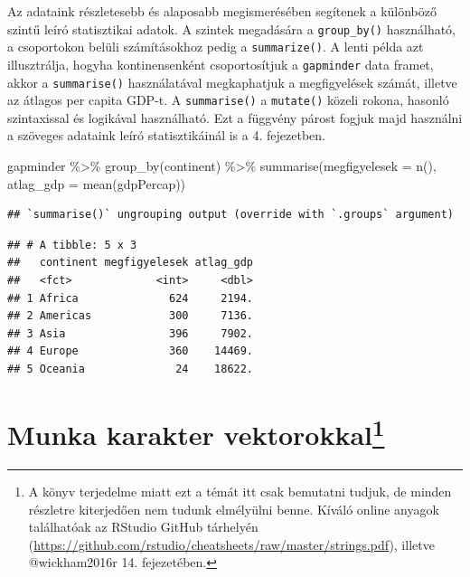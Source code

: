\documentclass[
]{book}
\newenvironment{Shaded}{\begin{snugshade}}{\end{snugshade}}
\newcommand{\AttributeTok}[1]{\textcolor[rgb]{0.77,0.63,0.00}{#1}}
\newcommand{\FunctionTok}[1]{\textcolor[rgb]{0.00,0.00,0.00}{#1}}
\newcommand{\NormalTok}[1]{#1}
\newcommand{\SpecialCharTok}[1]{\textcolor[rgb]{0.00,0.00,0.00}{#1}}
\begin{document}
Az adataink részletesebb és alaposabb megismerésében segítenek a
különböző szintű leíró statisztikai adatok. A szintek megadására a
\texttt{group\_by()} használható, a csoportokon belüli számításokhoz
pedig a \texttt{summarize()}. A lenti példa azt illusztrálja, hogyha
kontinensenként csoportosítjuk a \texttt{gapminder} data framet, akkor a
\texttt{summarise()} használatával megkaphatjuk a megfigyelések számát,
illetve az átlagos per capita GDP-t. A \texttt{summarise()} a
\texttt{mutate()} közeli rokona, hasonló szintaxissal és logikával
használható. Ezt a függvény párost fogjuk majd használni a szöveges
adataink leíró statisztikáinál is a 4. fejezetben.

\begin{Shaded}
\begin{Highlighting}[]
\NormalTok{gapminder }\SpecialCharTok{\%\textgreater{}\%} 
  \FunctionTok{group\_by}\NormalTok{(continent) }\SpecialCharTok{\%\textgreater{}\%} 
  \FunctionTok{summarise}\NormalTok{(}\AttributeTok{megfigyelesek =} \FunctionTok{n}\NormalTok{(), }\AttributeTok{atlag\_gdp =} \FunctionTok{mean}\NormalTok{(gdpPercap))}
\end{Highlighting}
\end{Shaded}

\begin{verbatim}
## `summarise()` ungrouping output (override with `.groups` argument)
\end{verbatim}

\begin{verbatim}
## # A tibble: 5 x 3
##   continent megfigyelesek atlag_gdp
##   <fct>             <int>     <dbl>
## 1 Africa              624     2194.
## 2 Americas            300     7136.
## 3 Asia                396     7902.
## 4 Europe              360    14469.
## 5 Oceania              24    18622.
\end{verbatim}

\hypertarget{munka-karakter-vektorokkaladatkezeles-4}{%
\section[Munka karakter vektorokkal]{\texorpdfstring{Munka karakter
vektorokkal\footnote{A könyv terjedelme miatt ezt a témát itt csak
  bemutatni tudjuk, de minden részletre kiterjedően nem tudunk
  elmélyülni benne. Kíváló online anyagok találhatóak az RStudio GitHub
  tárhelyén
  (\url{https://github.com/rstudio/cheatsheets/raw/master/strings.pdf}),
  illetve @wickham2016r 14. fejezetében.}}{Munka karakter vektorokkal}}\label{munka-karakter-vektorokkaladatkezeles-4}}
\end{document}

